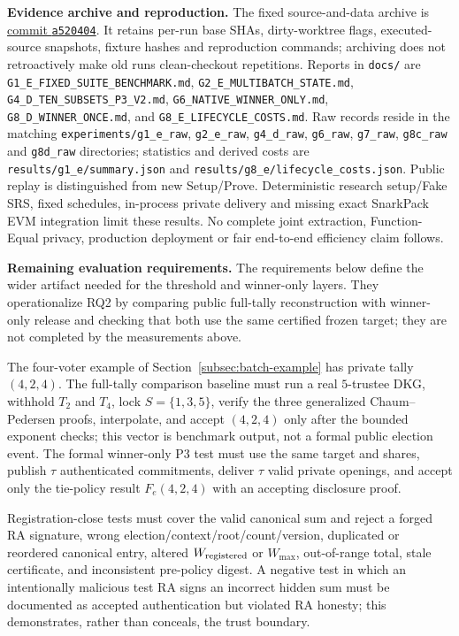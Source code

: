 \documentclass[pdflatex,sn-mathphys-num]{sn-jnl}%
\theoremstyle{thmstyleone}%
\theoremstyle{thmstyletwo}%
\theoremstyle{thmstylethree}%
\begin{document}
\textbf{Evidence archive and reproduction.}
The fixed source-and-data archive is
\href{https://github.com/fate-st/verivoting/tree/a5204043bdcec5a788f79de2ad79225320845e64}{commit \texttt{a520404}}.
It retains per-run base SHAs, dirty-worktree flags, executed-source snapshots,
fixture hashes and reproduction commands; archiving does not retroactively
make old runs clean-checkout repetitions. Reports in \texttt{docs/} are
\texttt{G1\_E\_FIXED\_SUITE\_BENCHMARK.md},
\texttt{G2\_E\_MULTIBATCH\_STATE.md},
\texttt{G4\_D\_TEN\_SUBSETS\_P3\_V2.md},
\texttt{G6\_NATIVE\_WINNER\_ONLY.md},
\texttt{G8\_D\_WINNER\_ONCE.md}, and
\texttt{G8\_E\_LIFECYCLE\_COSTS.md}.
Raw records reside in the matching \texttt{experiments/g1\_e\_raw},
\texttt{g2\_e\_raw}, \texttt{g4\_d\_raw}, \texttt{g6\_raw},
\texttt{g7\_raw}, \texttt{g8c\_raw} and \texttt{g8d\_raw} directories;
statistics and derived costs are \texttt{results/g1\_e/summary.json} and
\texttt{results/g8\_e/lifecycle\_costs.json}. Public replay is distinguished
from new Setup/Prove. Deterministic research setup/Fake SRS, fixed schedules,
in-process private delivery and missing exact SnarkPack EVM integration
limit these results. No complete joint extraction, Function-Equal privacy,
production deployment or fair end-to-end efficiency claim follows.

\textbf{Remaining evaluation requirements.}
The requirements below define the wider artifact needed for the threshold
and winner-only layers.  They operationalize RQ2 by comparing public
full-tally reconstruction with winner-only release and checking that both use
the same certified frozen target; they are not completed by the measurements
above.

The four-voter example of Section~\ref{subsec:batch-example} has private tally
$(4,2,4)$.  The full-tally comparison baseline must run a real $5$-trustee DKG, withhold
$T_2$ and $T_4$, lock $S=\{1,3,5\}$, verify the three generalized
Chaum--Pedersen proofs, interpolate, and accept $(4,2,4)$ only after the
bounded exponent checks; this vector is benchmark output, not a formal public
election event.  The formal winner-only P3 test must use the same target and
shares, publish $\tau$ authenticated commitments, deliver $\tau$ valid private
openings, and accept only the tie-policy result $F_e(4,2,4)$ with an accepting
disclosure proof.

Registration-close tests must cover the valid canonical sum and reject a
forged RA signature, wrong election/context/root/count/version, duplicated or
reordered canonical entry, altered $W_{\rm registered}$ or $W_{\max}$,
out-of-range total, stale certificate, and inconsistent pre-policy digest.
A negative test in which an intentionally malicious test RA signs an incorrect
hidden sum must be documented as accepted authentication but violated RA
honesty; this demonstrates, rather than conceals, the trust boundary.
\end{document}
